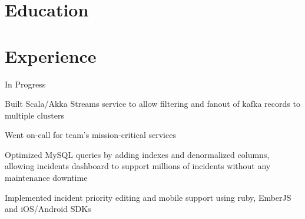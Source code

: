 \documentclass[12pt]{jmichaud-resume}
\begin{document}
\begin{minipage}[t]{0.29\textwidth}
\vspace{20pt}

\section{Education} 




\end{minipage}
\hfill
\begin{minipage}[t]{0.64\textwidth}
\section{Experience}
 \hfill {}

\vspace{10pt}

\begin{tightemize}
	\item In Progress
	
\end{tightemize}
\sectionsep
{} \hfill {}


\begin{tightemize}
	\item Built Scala/Akka Streams service to allow filtering and fanout of kafka records to multiple clusters
	\item Went on-call for team's mission-critical services
	
\end{tightemize}
\sectionsep
{}\hfill {}

\vspace{3pt}

\begin{tightemize}
	\item Optimized MySQL queries by adding indexes and denormalized columns, allowing incidents dashboard to support millions of incidents without any maintenance downtime
	\item Implemented incident priority editing and mobile support using ruby, EmberJS and iOS/Android SDKs
\end{tightemize}
\sectionsep


\end{minipage}
\end{document}
